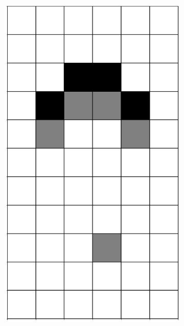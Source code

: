 \documentclass[12pt]{article}
\numberwithin{figure}{section} %
\begin{document}
\begin{figure}[H]
\begin{subfigure}{0.19\textwidth}
     \includegraphics[width=\linewidth]{Section4/2.3}
   \end{subfigure}
        \begin{subfigure}{0.19\textwidth}
     \centering

\end{subfigure}
\end{figure}
\end{document}
